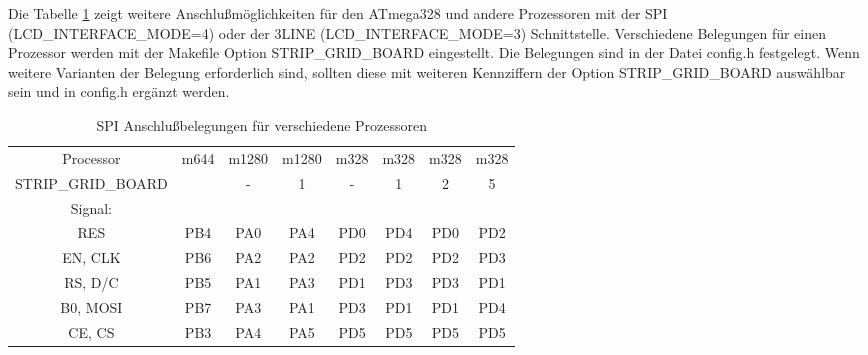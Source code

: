 Die Tabelle \ref{tab:spi-processor} zeigt weitere Anschlußmöglichkeiten
für den ATmega328 und andere Prozessoren mit der SPI (LCD\_INTERFACE\_MODE=4)
oder der 3LINE (LCD\_INTERFACE\_MODE=3) Schnittstelle. Verschiedene Belegungen für
einen Prozessor werden mit der Makefile Option STRIP\_GRID\_BOARD
eingestellt.
Die Belegungen sind in der Datei config.h festgelegt. 
Wenn weitere Varianten der Belegung erforderlich sind, sollten diese
mit weiteren Kennziffern der Option STRIP\_GRID\_BOARD auswählbar sein
und in config.h ergänzt werden.

\begin{table}[H]
  \begin{center}
    \begin{tabular}{| c || c | c | c | c | c | c | c |}
    \hline
 Processor  & m644  & m1280 & m1280  & m328 & m328 & m328 & m328 \\
STRIP\_GRID\_BOARD &       &   -   &   1    &  -   &  1   &  2   &  5   \\
    \hline
    \hline
Signal:     &       &       &        &      &      &      &      \\
  RES       &  PB4  & PA0   &  PA4   & PD0  & PD4  & PD0  & PD2 \\
    \hline
  EN, CLK   &  PB6  & PA2   &  PA2   & PD2  & PD2  & PD2  & PD3 \\
    \hline
  RS, D/C   &  PB5  & PA1   &  PA3   & PD1  & PD3  & PD3  & PD1 \\
    \hline
  B0, MOSI  &  PB7  & PA3   &  PA1   & PD3  & PD1  & PD1  & PD4 \\
    \hline
  CE, CS    &  PB3  & PA4   &  PA5   & PD5  & PD5  & PD5  & PD5 \\
    \hline
    \end{tabular}
  \end{center}
  \caption{SPI Anschlußbelegungen für verschiedene Prozessoren}
  \label{tab:spi-processor}
\end{table}

